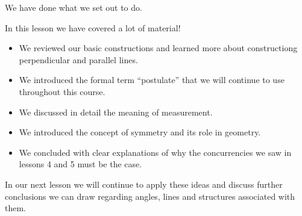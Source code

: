 \documentclass{tufte-handout}
\newcommand{\uv}{\vspace{.1in}}
\begin{document}
\begin{tcolorbox}[enhanced jigsaw,breakable,pad at break*=1mm,
  colback=cyan!2!white,colframe=blue!75!black,title=Student View: Slide 16,drop fuzzy shadow,watermark color=white,watermark text=\arabic{tcbbreakpart}]
We have done what we set out to do. \dCooley[-3][yellow]  

\uv In this lesson we have covered a lot of material!
\begin{itemize}
    \item We reviewed our basic constructions and learned more about constructiong perpendicular and parallel lines.
    \item We introduced the formal term ``postulate'' that we will continue to use throughout this course.
    \item We discussed in detail the meaning of measurement.
    \item We introduced the concept of symmetry and its role in geometry.
    \item We concluded with clear explanations of why the concurrencies we saw in lessons 4 and 5 must be the case.
\end{itemize}

In our next lesson we will continue to apply these ideas and discuss further conclusions we can draw regarding angles, lines and structures associated with them. 
  
 
\end{tcolorbox}
  
  

 
 
 


 
\end{document}
